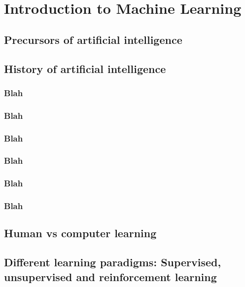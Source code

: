 \renewcommand{\prevpart}{0 }
\renewcommand{\thispart}{1 }
\renewcommand{\nextpart}{2 }

\section{Introduction to Machine Learning}





\subsection{Precursors of artificial intelligence}

\subsection{History of artificial intelligence}
\subsubsection{Blah}
\subsubsection{Blah}
\subsubsection{Blah}
\subsubsection{Blah}
\subsubsection{Blah}
\subsubsection{Blah}


\subsection{Human vs computer learning}

\subsection{Different learning paradigms: Supervised, unsupervised and reinforcement learning}

